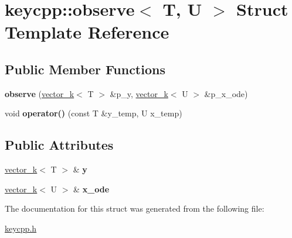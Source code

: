 \hypertarget{structkeycpp_1_1observe}{\section{keycpp\-:\-:observe$<$ T, U $>$ Struct Template Reference}
\label{structkeycpp_1_1observe}
}
\subsection*{Public Member Functions}
\begin{DoxyCompactItemize}
\item 
\hypertarget{structkeycpp_1_1observe_a25cd784e02dd29ddc7c9e7aa32c04164}{{\bfseries observe} (\hyperlink{classkeycpp_1_1vector__k}{vector\-\_\-k}$<$ T $>$ \&p\-\_\-y, \hyperlink{classkeycpp_1_1vector__k}{vector\-\_\-k}$<$ U $>$ \&p\-\_\-x\-\_\-ode)}\label{structkeycpp_1_1observe_a25cd784e02dd29ddc7c9e7aa32c04164}

\item 
\hypertarget{structkeycpp_1_1observe_a0063ab6fcada5756c6dca31ac7c17af9}{void {\bfseries operator()} (const T \&y\-\_\-temp, U x\-\_\-temp)}\label{structkeycpp_1_1observe_a0063ab6fcada5756c6dca31ac7c17af9}

\end{DoxyCompactItemize}
\subsection*{Public Attributes}
\begin{DoxyCompactItemize}
\item 
\hypertarget{structkeycpp_1_1observe_ab743b1b0a5ae0e8e63e780b798e9947b}{\hyperlink{classkeycpp_1_1vector__k}{vector\-\_\-k}$<$ T $>$ \& {\bfseries y}}\label{structkeycpp_1_1observe_ab743b1b0a5ae0e8e63e780b798e9947b}

\item 
\hypertarget{structkeycpp_1_1observe_a855c64ce69030f46682add6c53390cb8}{\hyperlink{classkeycpp_1_1vector__k}{vector\-\_\-k}$<$ U $>$ \& {\bfseries x\-\_\-ode}}\label{structkeycpp_1_1observe_a855c64ce69030f46682add6c53390cb8}

\end{DoxyCompactItemize}


The documentation for this struct was generated from the following file\-:\begin{DoxyCompactItemize}
\item 
\hyperlink{keycpp_8h}{keycpp.\-h}\end{DoxyCompactItemize}
